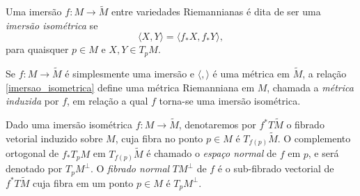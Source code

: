 \begin{definicao}
	Uma imersão $f: M \rightarrow \tilde{M}$ entre variedades Riemannianas é dita de ser uma \textit{imersão isométrica} se
	\begin{equation}
	\label{imersao_isometrica}
	\langle X,Y \rangle = \langle f_* X, f_* Y \rangle,
	\end{equation}
	para quaisquer $p \in M$ e $X,Y \in T_p M$.
\end{definicao}

\begin{observacao}
	Se $f: M \rightarrow \tilde{M}$ é simplesmente uma imersão e $\langle , \rangle$ é uma métrica em $\tilde{M}$, a relação \eqref{imersao_isometrica} define uma métrica Riemanniana em $M$, chamada a \textit{métrica induzida} por $f$, em relação a qual $f$ torna-se uma imersão isométrica.
\end{observacao}

\begin{observacao}
	Dado uma imersão isométrica $f:M \rightarrow \tilde{M}$, denotaremos por $f^* T \tilde{M}$ o fibrado vetorial induzido sobre $M$, cuja fibra no ponto $p \in M$ é $T_{f(p)} \tilde{M}$. O complemento ortogonal de $f_* T_p M$ em $T_{f(p)} \tilde{M}$ é chamado o \textit{espaço normal} de $f$ em $p$, e será denotado por $T_p M^\perp$. O \textit{fibrado normal} $TM^\perp$ de $f$ é o sub-fibrado vectorial de $f^* T \tilde{M}$ cuja fibra em um ponto $p \in M$ é $T_p M^\perp$.
\end{observacao}
